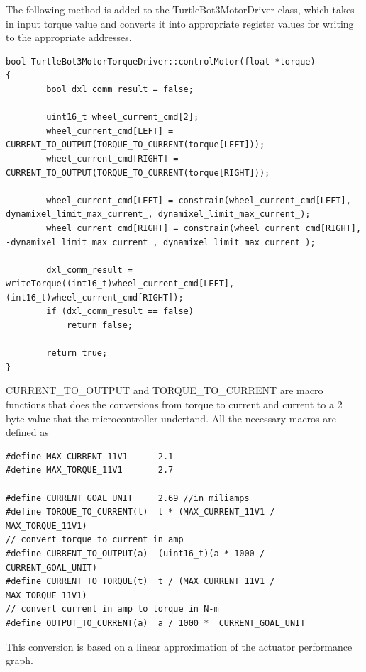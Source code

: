 \documentclass[12]{article}
\begin{document}
The following method is added to the TurtleBot3MotorDriver class, which takes in input torque value and converts it into appropriate register values for writing to the appropriate addresses.

\begin{lstlisting}
bool TurtleBot3MotorTorqueDriver::controlMotor(float *torque)
{
        bool dxl_comm_result = false;

        uint16_t wheel_current_cmd[2];
        wheel_current_cmd[LEFT] = CURRENT_TO_OUTPUT(TORQUE_TO_CURRENT(torque[LEFT]));
        wheel_current_cmd[RIGHT] = CURRENT_TO_OUTPUT(TORQUE_TO_CURRENT(torque[RIGHT]));

        wheel_current_cmd[LEFT] = constrain(wheel_current_cmd[LEFT], -dynamixel_limit_max_current_, dynamixel_limit_max_current_);
        wheel_current_cmd[RIGHT] = constrain(wheel_current_cmd[RIGHT], -dynamixel_limit_max_current_, dynamixel_limit_max_current_);

        dxl_comm_result = writeTorque((int16_t)wheel_current_cmd[LEFT], (int16_t)wheel_current_cmd[RIGHT]);
        if (dxl_comm_result == false)
            return false;

        return true;
}
\end{lstlisting}
CURRENT\_TO\_OUTPUT and TORQUE\_TO\_CURRENT are macro functions that does the conversions from torque to current and current to a 2 byte value that the microcontroller undertand. 
All the necessary macros are defined as
\begin{lstlisting}
#define MAX_CURRENT_11V1      2.1
#define MAX_TORQUE_11V1       2.7

#define CURRENT_GOAL_UNIT     2.69 //in miliamps
#define TORQUE_TO_CURRENT(t)  t * (MAX_CURRENT_11V1 /  MAX_TORQUE_11V1)
// convert torque to current in amp
#define CURRENT_TO_OUTPUT(a)  (uint16_t)(a * 1000 /  CURRENT_GOAL_UNIT)
#define CURRENT_TO_TORQUE(t)  t / (MAX_CURRENT_11V1 /  MAX_TORQUE_11V1)
// convert current in amp to torque in N-m
#define OUTPUT_TO_CURRENT(a)  a / 1000 *  CURRENT_GOAL_UNIT
\end{lstlisting}

This conversion is based on a linear approximation of the actuator performance graph.
\end{document}

